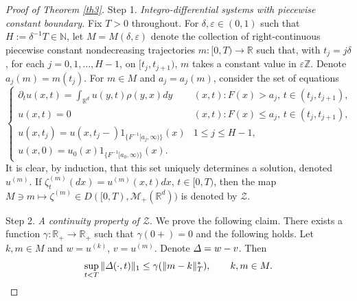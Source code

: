 \documentclass[11pt]{amsart}
\theoremstyle{plain}
\newcommand{\eps}{\varepsilon}
\newcommand{\gam}{\gamma}
\newcommand{\del}{\delta}
\newcommand{\Del}{\mathnormal{\Delta}}
\newcommand{\N}{{\mathbb N}}
\newcommand{\R}{{\mathbb R}}
\newcommand{\Z}{{\mathbb Z}}
\newcommand{\calM}{{\mathcal M}}
\newcommand{\calZ}{{\mathcal Z}}
\newcommand{\pl}{\partial}
\newcommand{\iy}{\infty}
\newcommand{\ds}{\displaystyle}
\newcommand{\F}{F}
\begin{document}
\begin{proof}[Proof of Theorem \ref{th3}]
Step 1.
{\it Integro-differential systems with piecewise constant boundary.}
Fix $T>0$ throughout.
For $\del,\eps\in(0,1)$ such that $H:=\del^{-1}T\in\N$,
let $M=M(\del,\eps)$
denote the collection of right-continuous
piecewise constant nondecreasing
trajectories $m:[0,T)\to\R$ such that, with $t_j=j\del$,
for each $j=0,1,\ldots,H-1$, on $[t_j,t_{j+1})$,
$m$ takes a constant value in $\eps\Z$.
Denote $a_j(m)=m(t_j)$.
For $m\in M$ and $a_j=a_j(m)$, consider the set of equations
\begin{equation}\label{b1}
\begin{cases}\ds
\pl_tu(x,t)=\int_{\R^d}u(y,t)\rho(y,x)dy &
(x,t):\F(x)>a_j,\,t\in(t_j,t_{j+1}),\\
u(x,t)=0 & (x,t):\F(x)\le a_j,\,t\in(t_j,t_{j+1}), \\
\ds
u(x,t_j)= u(x,t_j-)1_{\{F^{-1}[a_j,\iy)\}}(x) & 1\le j \le H-1,
\\
u(x,0)=u_0(x)1_{\{F^{-1}[a_0,\iy)\}}(x).
\end{cases}
\end{equation}
It is clear, by induction, that this set uniquely determines a solution,
denoted $u^{(m)}$. If
$\zeta^{(m)}_t(dx)=u^{(m)}(x,t)dx$, $t\in[0,T)$,
then the map $M\ni m\mapsto\zeta^{(m)}\in D([0,T),\calM_+(\R^d))$
is denoted by $\calZ$.

Step 2. {\it A continuity property of $\calZ$}. We prove the following claim.
There exists a function $\gam:\R_+\to\R_+$ such that
$\gam(0+)=0$ and the following holds.
Let $k,m\in M$ and $w=u^{(k)}$, $v=u^{(m)}$.
Denote $\Del=w-v$. Then
\begin{equation}\label{b6}
\sup_{t<T}\|\Del(\cdot,t)\|_1\le\gam(\|m-k\|^*_T),
\qquad k,m\in M.
\end{equation}


\end{proof}
\end{document}
